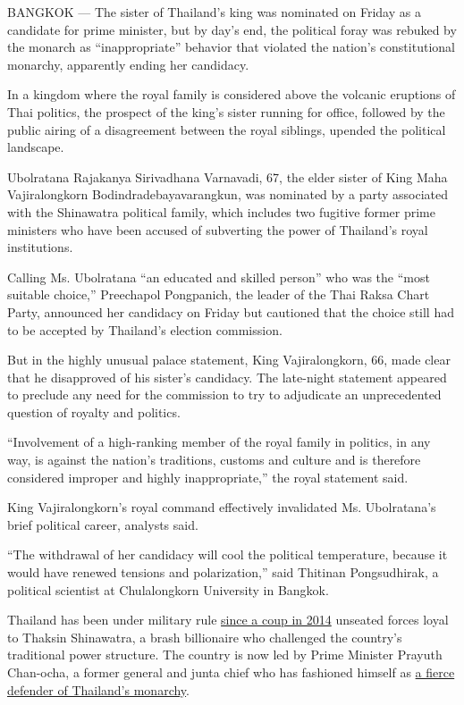BANGKOK --- The sister of Thailand's king was nominated on Friday as a
candidate for prime minister, but by day's end, the political foray was
rebuked by the monarch as ``inappropriate'' behavior that violated the
nation's constitutional monarchy, apparently ending her candidacy.

In a kingdom where the royal family is considered above the volcanic
eruptions of Thai politics, the prospect of the king's sister running
for office, followed by the public airing of a disagreement between the
royal siblings, upended the political landscape.

Ubolratana Rajakanya Sirivadhana Varnavadi, 67, the elder sister of King
Maha Vajiralongkorn Bodindradebayavarangkun, was nominated by a party
associated with the Shinawatra political family, which includes two
fugitive former prime ministers who have been accused of subverting the
power of Thailand's royal institutions.

Calling Ms. Ubolratana ``an educated and skilled person'' who was the
``most suitable choice,'' Preechapol Pongpanich, the leader of the Thai
Raksa Chart Party, announced her candidacy on Friday but cautioned that
the choice still had to be accepted by Thailand's election commission.

But in the highly unusual palace statement, King Vajiralongkorn, 66,
made clear that he disapproved of his sister's candidacy. The late-night
statement appeared to preclude any need for the commission to try to
adjudicate an unprecedented question of royalty and politics.

``Involvement of a high-ranking member of the royal family in politics,
in any way, is against the nation's traditions, customs and culture and
is therefore considered improper and highly inappropriate,'' the royal
statement said.

King Vajiralongkorn's royal command effectively invalidated Ms.
Ubolratana's brief political career, analysts said.

``The withdrawal of her candidacy will cool the political temperature,
because it would have renewed tensions and polarization,'' said Thitinan
Pongsudhirak, a political scientist at Chulalongkorn University in
Bangkok.

Thailand has been under military rule
\href{https://www.nytimes3xbfgragh.onion/2014/05/23/world/asia/thailand-military-coup.html?module=inline}{since
a coup in 2014} unseated forces loyal to Thaksin Shinawatra, a brash
billionaire who challenged the country's traditional power structure.
The country is now led by Prime Minister Prayuth Chan-ocha, a former
general and junta chief who has fashioned himself as
\href{https://www.nytimes3xbfgragh.onion/2014/05/27/world/asia/thailand.html}{a
fierce defender of Thailand's monarchy}.

